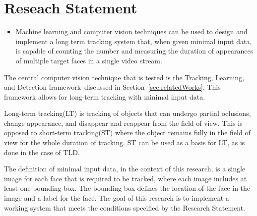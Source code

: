 \section{Reseach Statement}
  \begin{itemize}
    \item
    Machine learning and computer vision techniques can be used to design and implement a long term tracking system that, when given minimal input data, is capable of counting the number and measuring the duration of appearances of multiple target faces in a single video stream.
  \end{itemize}

  The central computer vision technique that is tested is the Tracking, Learning, and Detection framework--discussed in Section~\ref{sec:relatedWorks}.
  This framework allows for long-term tracking with minimal input data. 
  
  Long-term tracking(LT) is tracking of objects that can undergo partial oclusions, change appearance, and disappear and reappear from the field of view.
  This is opposed to short-term tracking(ST) where the object remains fully in the field of view for the whole duration of tracking.
  ST can be used as a basis for LT, as is done in the case of TLD.

  The definition of minimal input data, in the context of this research, is a single image for each face that is required to be tracked, where each image includes at least one bounding box.
  The bounding box defines the location of the face in the image and a label for the face.
  The goal of this research is to implement a working system that meets the conditions specified by the Research Statement.
